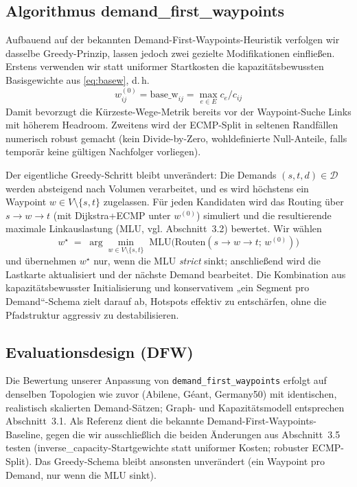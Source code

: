 \documentclass[sigconf,nonacm,review]{acmart}
\begin{document}
\subsection{Algorithmus \texorpdfstring{\textbf{demand\_first\_waypoints}}{demand_first_waypoints}}
Aufbauend auf der bekannten Demand-First-Waypoints-Heuristik verfolgen wir dasselbe Greedy-Prinzip,
lassen jedoch zwei gezielte Modifikationen einfließen. Erstens verwenden wir statt uniformer
Startkosten die kapazitätsbewussten Basisgewichte aus \eqref{eq:basew}, d.\,h.
\[
w^{(0)}_{ij}=\mathrm{base\_w}_{ij}=\max_{e\in E}c_e/c_{ij}
\] 
Damit bevorzugt die Kürzeste-Wege-Metrik
bereits vor der Waypoint-Suche Links mit höherem Headroom. Zweitens wird der ECMP-Split in seltenen
Randfällen numerisch robust gemacht (kein Divide-by-Zero, wohldefinierte Null-Anteile, falls temporär
keine gültigen Nachfolger vorliegen).

Der eigentliche Greedy-Schritt bleibt unverändert: Die Demands $(s,t,d)\in\mathcal D$ werden
absteigend nach Volumen verarbeitet, und es wird höchstens ein Waypoint $w\in V\setminus\{s,t\}$
zugelassen. Für jeden Kandidaten wird das Routing über $s\!\to\!w\!\to\!t$ (mit Dijkstra+ECMP unter
$w^{(0)}$) simuliert und die resultierende maximale Linkauslastung (MLU, vgl. Abschnitt~3.2) bewertet.
Wir wählen
\begin{equation}
w^\star \;=\; \arg\min_{w\in V\setminus\{s,t\}} \; \mathrm{MLU}\bigl(\text{Routen}(s{\to}w{\to}t; \, w^{(0)})\bigr)
\end{equation}
und übernehmen $w^\star$ nur, wenn die MLU \emph{strict} sinkt; anschließend wird die Lastkarte
aktualisiert und der nächste Demand bearbeitet. Die Kombination aus kapazitätsbewusster
Initialisierung und konservativem „ein Segment pro Demand“-Schema zielt darauf ab, Hotspots effektiv
zu entschärfen, ohne die Pfadstruktur aggressiv zu destabilisieren.

\subsection{Evaluationsdesign (DFW)}
Die Bewertung unserer Anpassung von \texttt{demand\_first\_waypoints} erfolgt auf denselben
Topologien wie zuvor (Abilene, Géant, Germany50) mit identischen, realistisch skalierten
Demand-Sätzen; Graph- und Kapazitätsmodell entsprechen Abschnitt~3.1. Als Referenz dient die
bekannte Demand-First-Waypoints-Baseline, gegen die wir ausschließlich die beiden Änderungen aus
Abschnitt~3.5 testen (inverse\_capacity-Startgewichte statt uniformer Kosten; robuster ECMP-Split).
Das Greedy-Schema bleibt ansonsten unverändert (ein Waypoint pro Demand, nur wenn die MLU sinkt).
\end{document}
